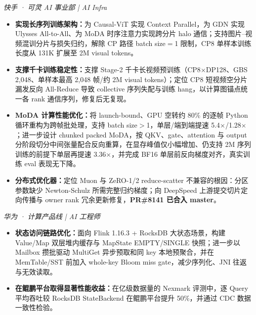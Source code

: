 \documentclass{resume}
\newcommand{\zh}[1]{#1}
\begin{document}
\zh{}
\zh{{\small\itshape 快手 · 可灵 AI 事业部 | AI Infra}\par}
\begin{itemize}[parsep=0.25ex]
	\item \zh{\textbf{实现长序列训练架构：}为 Causal-ViT 实现 Context Parallel，为 GDN 实现 Ulysses All-to-All、为 MoDA 时序注意力实现跨分片 halo 通信；支持图片--视频混训分片与损失归约，解除 CP 路径 batch size$=$1 限制，CP8 单样本训练长度从 131K 扩展至 2M visual tokens。}
	\item \zh{\textbf{支撑千卡训练稳定性：}支撑 Stage-2 千卡长视频预训练（CP8$\times$DP128、GBS 2,048、单样本最高 2,048 帧/约 2M visual tokens）；定位 CP8 短视频空分片漏发反向 All-Reduce 导致 collective 序列失配与训练 hang，以计算图锚点统一各 rank 通信序列，修复后无复现。}
	\item \zh{\textbf{MoDA 计算性能优化：}将 launch-bound、GPU 空转约 80\% 的逐帧 Python 循环重构为跨帧批处理，支持 batch size$>$1，单层/端到端提速 5.4$\times$/1.28$\times$；进一步设计 chunked packed MoDA，按 QKV、gate、attention 与 output 分阶段切分中间张量配合反向重算，在显存峰值仅小幅增加、仍支持 2M 序列训练的前提下单层再提速 3.36$\times$，并完成 BF16 单层前反向梯度对齐，真实训练 eval 表现无下降。}
	\item \zh{\textbf{分布式优化器：}定位 Muon 与 ZeRO-1/2 reduce-scatter 不兼容的根因：分区参数缺少 Newton-Schulz 所需完整归约梯度；向 DeepSpeed 上游提交切片定向传播与 owner rank 冗余更新修复，\textbf{PR\#8141 已合入 master}。}
\end{itemize}

\zh{}
\zh{{\small\itshape 华为 · 计算产品线 | AI 工程师}\par}
\begin{itemize}[parsep=0.25ex]
	\item \zh{\textbf{状态访问链路优化：}面向 Flink 1.16.3 + RocksDB 大状态场景，构建 Value/Map 双层堆内缓存与 MapState EMPTY/SINGLE 快照；进一步以 Mailbox 攒批驱动 MultiGet 异步预取和同 key 本地预聚合，并在 MemTable/SST 前加入 whole-key Bloom miss gate，减少序列化、JNI 往返与无效读取。}
	\item \zh{\textbf{在鲲鹏平台取得显著性能收益：}在亿级数据量的 Nexmark 评测中，逐 Query 平均吞吐较 RocksDB StateBackend 在鲲鹏平台提升 50\%，并通过 CDC 数据一致性检验。}
\end{itemize}
\end{document}
